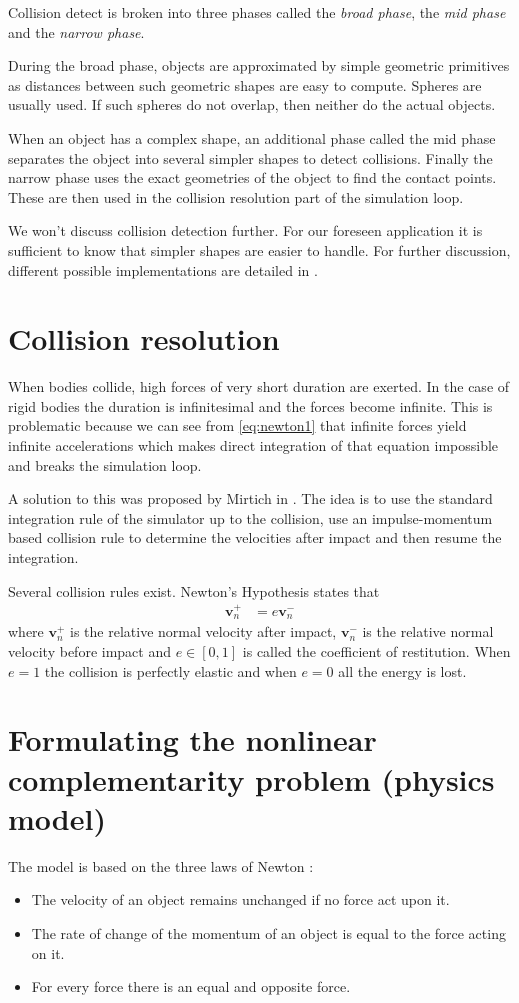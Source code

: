 Collision detect is broken into three phases called the \emph{broad phase}, the \emph{mid phase} and the \emph{narrow phase}. 

During the broad phase, objects are approximated by simple geometric primitives as distances between such geometric shapes are easy to compute. Spheres are usually used. If such spheres do not overlap, then neither do the actual objects.

When an object has a complex shape, an additional phase called the mid phase separates the object into several simpler shapes to detect collisions. Finally the narrow phase uses the exact geometries of the object to find the contact points. These are then used in the collision resolution part of the simulation loop.

We won't discuss collision detection further. For our foreseen application it is sufficient to know that simpler shapes are easier to handle. For further discussion, different possible implementations are detailed in \cite{jimenez20013d}.

\section{Collision resolution \label{sec:contact}}
When bodies collide, high forces of very short duration are exerted. In the case of rigid bodies the duration is infinitesimal and the forces become infinite. This is problematic because we can see from \cref{eq:newton1} that infinite forces yield infinite accelerations which makes direct integration of that equation impossible and breaks the simulation loop.

A solution to this was proposed by Mirtich in \cite{mirtich1996impulse}. The idea is to use the standard integration rule of the simulator up to the collision, use an impulse-momentum based collision rule to determine the velocities after impact and then resume the integration.

Several collision rules exist. Newton's Hypothesis states that 
\begin{align*}
\mathbf{v}_n^+ &= e\mathbf{v}_n^-
\end{align*}
where $\mathbf{v}_n^+$ is the relative normal velocity after impact, $\mathbf{v}_n^-$ is the relative normal velocity before impact and $e \in [0, 1]$ is called the coefficient of restitution. When $e=1$ the collision is perfectly elastic and when $e=0$ all the energy is lost.

\section{Formulating the nonlinear complementarity problem (physics model)}
The model is based on the three laws of Newton :\begin{itemize}
\item The velocity of an object remains unchanged if no force act upon it.
\item The rate of change of the momentum of an object is equal to the force acting on it.
\item For every force there is an equal and opposite force.
\end{itemize}

